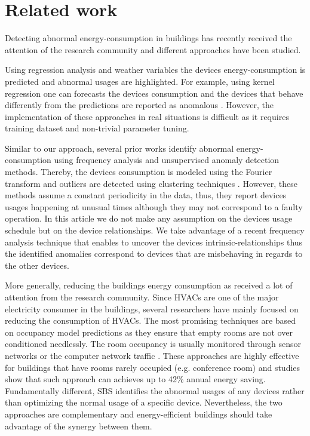 \section{Related work}
Detecting abnormal energy-consumption in buildings has recently received the attention of the research community and different approaches have been studied.

Using regression analysis and weather variables the devices energy-consumption is predicted and abnormal usages are highlighted.
For example, using kernel regression one can forecasts the devices consumption and the devices that behave differently from the predictions are reported as anomalous \cite{brown:buildperf2012}.
However, the implementation of these approaches in real situations is difficult as it requires training dataset and non-trivial parameter tuning.

Similar to our approach, several prior works identify abnormal energy-consumption using frequency analysis and unsupervised anomaly detection methods.
Thereby, the devices consumption is modeled using the Fourier transform and outliers are detected using clustering techniques \cite{Bellala_buildsys11,wrinch:pes2012,chen:aaaiw2011}. %
However, these methods assume a constant periodicity in the data, thus, they report devices usages happening at unusual times although they may not correspond to a faulty operation.
In this article we do not make any assumption on the devices usage schedule but on the device relationships.
We take advantage of a recent frequency analysis technique that enables to uncover the devices intrinsic-relationships \cite{romain:iotapp12} thus the identified anomalies correspond to devices that are misbehaving in regards to the other devices.

More generally, reducing the buildings energy consumption as received a lot of attention from the research community.
Since HVACs are one of the major electricity consumer in the buildings, several researchers have mainly focused on reducing the consumption of HVACs.
The most promising techniques are based on occupancy model predictions as they ensure that empty rooms are not over conditioned needlessly.
The room occupancy is usually monitored through sensor networks \cite{agarwal:ipsn2011,erickson:ipsn2011} or the computer network traffic \cite{kim:buildsys2010}.
These approaches are highly effective for buildings that have rooms rarely occupied (e.g. conference room) and studies show that such approach can achieves up to 42\% annual energy saving.
Fundamentally different, SBS identifies the abnormal usages of any devices rather than optimizing the normal usage of a specific device.
Nevertheless, the two approaches are complementary and energy-efficient buildings should take advantage of the synergy between them.






